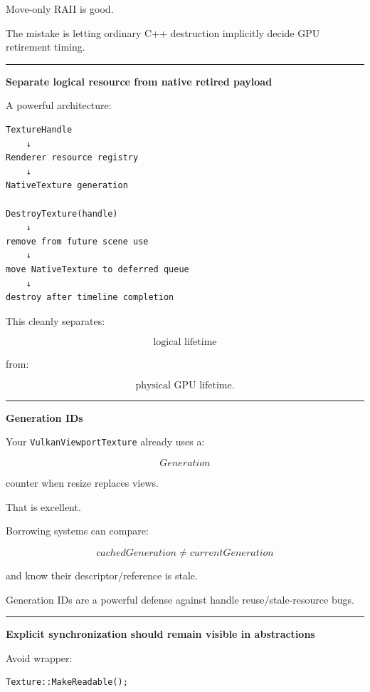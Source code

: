 Move-only RAII is good.

The mistake is letting ordinary C++ destruction implicitly decide GPU retirement timing.

\begin{center}\rule{0.5\linewidth}{0.5pt}\end{center}

\textbf{Separate logical resource from native retired payload}

A powerful architecture:

\begin{verbatim}
TextureHandle
    ↓
Renderer resource registry
    ↓
NativeTexture generation

DestroyTexture(handle)
    ↓
remove from future scene use
    ↓
move NativeTexture to deferred queue
    ↓
destroy after timeline completion
\end{verbatim}

This cleanly separates:

\[
\text{logical lifetime}
\]

from:

\[
\text{physical GPU lifetime}.
\]

\begin{center}\rule{0.5\linewidth}{0.5pt}\end{center}

\textbf{Generation IDs}

Your \texttt{VulkanViewportTexture} already uses a:

\[
Generation
\]

counter when resize replaces views.

That is excellent.

Borrowing systems can compare:

\[
cachedGeneration
\neq
currentGeneration
\]

and know their descriptor/reference is stale.

Generation IDs are a powerful defense against handle reuse/stale-resource bugs.

\begin{center}\rule{0.5\linewidth}{0.5pt}\end{center}

\textbf{Explicit synchronization should remain visible in abstractions}

Avoid wrapper:

\begin{verbatim}
Texture::MakeReadable();
\end{verbatim}

